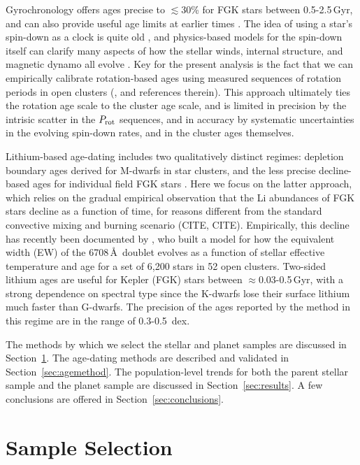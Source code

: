 \documentclass[11pt,twocolumn,tighten]{aastex63}
\begin{document}
Gyrochronology offers ages precise to $\lesssim$30\% for FGK stars
between 0.5-2.5\,Gyr, and can also provide useful age limits at
earlier times \citep{Bouma_2023}.  The idea of using a star's
spin-down as a clock is quite old
\citep{Skumanich_1972,Noyes_1984,Kawaler_1989,Barnes03,Mamajek_2008,Angus_2015},
and physics-based models for the spin-down itself can clarify many
aspects of how the stellar winds, internal structure, and magnetic
dynamo all evolve
\citep[e.g.][]{Matt_2015,Gallet_Bouvier_2015,Spada_2020}.  Key
for the present analysis is the fact that we can empirically calibrate
rotation-based ages using measured sequences of rotation periods
in open clusters
(\citealt{Bouma_2023}, and references therein).  This approach
ultimately ties the rotation age scale to the cluster age scale, and
is limited in precision by the intrisic scatter in the $P_{\rm rot}$
sequences, and in accuracy by systematic uncertainties in the evolving
spin-down rates, and in the cluster ages themselves.

Lithium-based age-dating includes two qualitatively distinct regimes:
depletion boundary ages derived for M-dwarfs in star clusters, and the
less precise decline-based ages for individual field FGK stars
\citep{Soderblom_2010}.  Here we focus on the latter approach, which
relies on the gradual empirical observation that the Li abundances of
FGK stars decline as a function of time, for reasons different from
the standard convective mixing and burning scenario (CITE, CITE).
Empirically, this decline has recently been documented by
\citet{Jeffries_2023}, who built a model for how the equivalent width
(EW) of the  6708\,\AA\ doublet evolves as a function of
stellar effective temperature and age for a set of 6{,}200 stars in 52
open clusters.  Two-sided lithium ages are useful for Kepler (FGK)
stars between $\approx$0.03-0.5\,Gyr, with a strong dependence on
spectral type since the K-dwarfs lose their surface lithium much
faster than G-dwarfs.  The precision of the ages reported by the
\citet{Jeffries_2023} method in this regime are in the range of
0.3-0.5~dex.

The methods by which we select the stellar and planet samples are 
discussed in Section~\ref{sec:selection}.
The age-dating methods are described and validated in
Section~\ref{sec:agemethod}.
The population-level trends for both the parent stellar sample and
the planet sample are discussed in Section~\ref{sec:results}.
A few conclusions are offered in Section~\ref{sec:conclusions}.


\section{Sample Selection}
\label{sec:selection}
\end{document}
